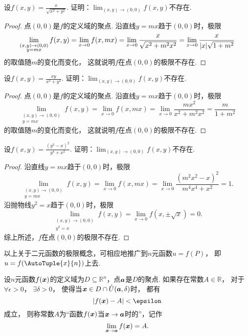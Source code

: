 \begin{example}
设\(f(x,y) = \frac{x}{\sqrt{x^2+y^2}}\).
证明：\(\lim_{(x,y)\to(0,0)} f(x,y)\)不存在.
\begin{proof}
点\((0,0)\)是\(f\)的定义域的聚点.
沿直线\(y=mx\)趋于\((0,0)\)时，极限\[
	\lim_{\substack{(x,y)\to(0,0) \\ y=mx}} f(x,y)
	= \lim_{x\to0} f(x,mx)
	= \lim_{x\to0} \frac{x}{\sqrt{x^2+m^2x^2}}
	= \lim_{x\to0} \frac{x}{\abs{x} \sqrt{1+m^2}}
\]的取值随\(m\)的变化而变化，
这就说明\(f\)在点\((0,0)\)的极限不存在.
\end{proof}
\end{example}
\begin{example}
设\(f(x,y) = \frac{xy}{x^2+y^2}\).
证明：\(\lim_{(x,y)\to(0,0)} f(x,y)\)不存在.
\begin{proof}
点\((0,0)\)是\(f\)的定义域的聚点.
沿直线\(y=mx\)趋于\((0,0)\)时，极限\[
	\lim_{\substack{(x,y)\to(0,0) \\ y=mx}} f(x,y)
	= \lim_{x\to0} f(x,mx)
	= \lim_{x\to0} \frac{mx^2}{x^2+m^2x^2}
	= \frac{m}{1+m^2}
\]的取值随\(m\)的变化而变化，
这就说明\(f\)在点\((0,0)\)的极限不存在.
\end{proof}
\end{example}
\begin{example}
设\(f(x,y) = \frac{(y^2-x)^2}{y^4+x^2}\).
证明：\(\lim_{(x,y)\to(0,0)} f(x,y)\)不存在.
\begin{proof}
沿直线\(y=mx\)趋于\((0,0)\)时，极限\[
	\lim_{\substack{(x,y)\to(0,0) \\ y=mx}} f(x,y)
	= \lim_{x\to0} f(x,mx)
	= \lim_{x\to0} \frac{(m^2x^2-x)^2}{m^4x^4+x^2}
	= 1.
\]
沿抛物线\(y^2=x\)趋于\((0,0)\)时，极限\[
	\lim_{\substack{(x,y)\to(0,0) \\ y^2=x}} f(x,y)
	= \lim_{x\to0} f(x,\pm\sqrt{x})
	= 0.
\]
综上所述，\(f\)在点\((0,0)\)的极限不存在.
\end{proof}
\end{example}

以上关于二元函数的极限概念，可相应地推广到\(n\)元函数\(u = f(P)\)，
即\(u = f(\AutoTuple{x}{n})\)上去.
\begin{definition}
设\(n\)元函数\(f(\boldsymbol{x})\)的定义域为\(D \subseteq \mathbb{R}^n\)，点\(\boldsymbol{a}\)是\(D\)的聚点.
如果存在常数\(A \in \mathbb{R}\)，
对于\(\forall\epsilon>0\)，
\(\exists\delta>0\)，
使得当\(\boldsymbol{x} \in D \cap \mathring{U}(\boldsymbol{a},\delta)\)时，
都有\[
	\abs{f(\vb{x}) - A} < \epsilon
\]成立，
则称常数\(A\)为“函数\(f(\boldsymbol{x})\)当\(\boldsymbol{x}\to\boldsymbol{a}\)时的”，记作\[
	\lim_{\boldsymbol{x}\to\boldsymbol{a}} f(\boldsymbol{x}) = A.
\]
\end{definition}

